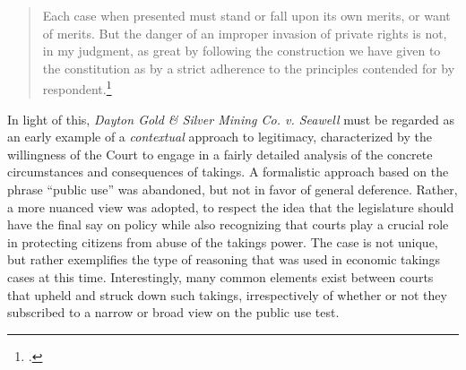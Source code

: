 \begin{quote}
 Each case when presented must stand or fall upon its own merits, or want of merits. But the danger of an improper invasion of private rights is not, in my judgment, as great by following the construction we have given to the constitution as by a strict adherence to the principles contended for by respondent.\footcite[398]{seawell76}
\end{quote}

In light of this, {\it Dayton Gold \& Silver Mining Co. v. Seawell} must be regarded as an early example of a {\it contextual} approach to legitimacy, characterized by the willingness of the Court to engage in a fairly detailed analysis of the concrete circumstances and consequences of takings. A formalistic approach based on the phrase ``public use'' was abandoned, but not in favor of general deference. Rather, a more nuanced view was adopted, to respect the idea that the legislature should have the final say on policy while also recognizing that courts play a crucial role in protecting citizens from abuse of the takings power. The case is not unique, but rather exemplifies the type of reasoning that was used in economic takings cases at this time. Interestingly, many common elements exist between courts that upheld and struck down such takings, irrespectively of whether or not they subscribed to a narrow or broad view on the public use test. 


